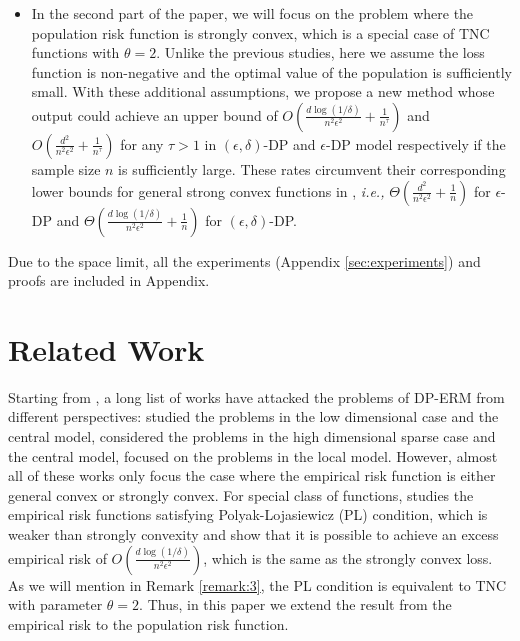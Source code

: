 \documentclass[12pt]{alt2022} %
\begin{document}
\begin{itemize}
    \item In the second part of the paper, we will focus on the problem where the population risk function is strongly convex, which is a special case of TNC functions with $\theta=2$. Unlike the previous studies, here we assume the loss function is non-negative and the optimal value of the population is sufficiently small. With these additional assumptions, we propose a new method whose output could achieve an upper bound of $O(\frac{d\log(1/\delta)}{n^2\epsilon^2}+\frac{1}{n^{\tau}})$ and $O(\frac{d^2}{n^2\epsilon^2}+\frac{1}{n^{\tau}})$ for any $\tau>1$ in $(\epsilon,\delta)$-DP and $\epsilon$-DP model respectively if the sample size $n$ is sufficiently large. These rates circumvent their corresponding lower bounds for general strong convex functions in \citep{feldman2020private}, {\em i.e.,} $\Theta(\frac{d^2}{n^2\epsilon^2}+\frac{1}{n})$ for $\epsilon$-DP and $\Theta(\frac{d\log(1/\delta)}{n^2\epsilon^2}+\frac{1}{n})$ for $(\epsilon, \delta)$-DP.
\end{itemize}
Due to the space limit, all the experiments (Appendix \ref{sec:experiments}) and proofs are included in Appendix. 
\section{Related Work}
Starting from \citep{chaudhuri2011differentially}, a long list of works have attacked the problems of DP-ERM
from different perspectives: \citep{bassily2014private, iyengar2019towards,zhou2020bypassing,song2020characterizing,wang2017differentially,zhang2017efficient} studied the problems in the low dimensional case and the central model, \citep{kasiviswanathan2016efficient,kifer2012private,talwar2015nearly,wang2020knowledge,cai2020cost} considered the problems in the high dimensional sparse case and the central model, \citep{smith2017interaction,duchi2013local,JMLR:v21:19-253,duchi2018minimax} focused on the problems in the local model. However, almost all of these works only focus the case where the 
empirical risk function is either general convex or strongly convex. For special class of functions, \citep{wang2017differentially} studies the empirical risk functions satisfying Polyak-{L}ojasiewicz (PL) condition, which is weaker than strongly convexity and show that it is possible to achieve an excess empirical risk of $O(\frac{d\log(1/\delta)}{n^2\epsilon^2})$, which is the same as the strongly convex loss. As we will mention in Remark \ref{remark:3}, the PL condition is equivalent to TNC with parameter $\theta=2$. Thus, in this paper we extend the result from the empirical risk to the population risk function. 
\end{document}
